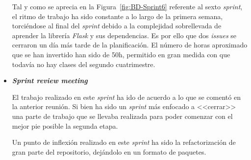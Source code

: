 \begin{itemize}
Tal y como se aprecia en la Figura~\ref{fig:BD-Sprint6} referente al sexto \textit{sprint}, el ritmo de trabajo ha sido constante a lo largo de la primera semana, torciéndose al final del \textit{sprint} debido a la complejidad sobrellevada de aprender la librería \textit{Flask} y sus dependencias. Es por ello que dos \textit{issues} se cerraron un día más tarde de la planificación.
El número de horas aproximado que se han invertido han sido de 50h, permitido en gran medida con que todavía no hay clases del segundo cuatrimestre.

\item \textbf{\textit{Sprint review meeting}}

El trabajo realizado en este \textit{sprint} ha ido de acuerdo a lo que se comentó en la anterior reunión. Si bien ha sido un \textit{sprint} más enfocado a <<cerrar>> una parte de trabajo que se llevaba realizada para poder comenzar con el mejor pie posible la segunda etapa.

Un punto de inflexión realizado en este \textit{sprint} ha sido la refactorización de gran parte del repositorio, dejándolo en un formato de paquetes.
\end{itemize}

